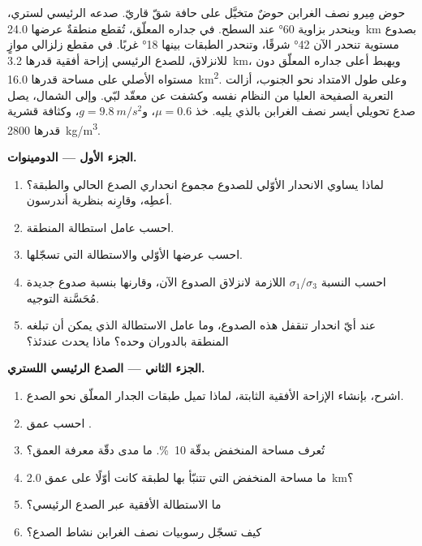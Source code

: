 \begin{problem}
\label{pb:b3:extension-strike-slip:1}
حوض مِيرو نصف الغرابن حوضٌ متخيَّل على حافة
شقّ قاريّ. صدعه الرئيسي لستري، وينحدر بزاوية \ang{60} عند السطح.
في جداره المعلّق، تُقطع منطقةٌ عرضها \qty{24.0}{km} بصدوع مستوية تنحدر الآن
\ang{42} شرقًا، وتنحدر الطبقات بينها \ang{18} غربًا. في مقطع زلزالي
موازٍ للانزلاق، للصدع الرئيسي إزاحة أفقية قدرها \qty{3.2}{km}،
ويهبط أعلى جداره المعلّق دون مستواه الأصلي على مساحة قدرها
\qty{16.0}{km^2}. وعلى طول الامتداد نحو الجنوب، أزالت التعرية الصفيحة العليا
من النظام نفسه وكشفت عن معقّد لبّي. وإلى الشمال، يصل صدع تحويلي أيسر
نصف الغرابن بالذي يليه. خذ $\mu =
0.6$، و$g = \qty{9.8}{m/s^2}$، وكثافة قشرية قدرها
\qty{2800}{kg/m^3}.

\medskip\noindent\textbf{الجزء الأول --- الدومينوات.}
\begin{enumerate}
  \item لماذا يساوي الانحدار الأوّلي للصدوع مجموع انحداري الصدع الحالي
        والطبقة؟ أعطِه، وقارِنه بنظرية أندرسون.
  \item احسب عامل استطالة المنطقة.
  \item احسب عرضها الأوّلي والاستطالة التي تسجّلها.
  \item احسب النسبة $\sigma_1/\sigma_3$ اللازمة لانزلاق الصدوع الآن، وقارنها
        بنسبة صدوع جديدة مُحَسَّنة التوجيه.
  \item عند أيّ انحدار تنقفل هذه الصدوع، وما عامل الاستطالة الذي يمكن أن تبلغه
        المنطقة بالدوران وحده؟ ماذا يحدث عندئذ؟
\end{enumerate}

\medskip\noindent\textbf{الجزء الثاني --- الصدع الرئيسي اللستري.}
\begin{enumerate}[resume]
  \item اشرح، بإنشاء الإزاحة الأفقية الثابتة، لماذا تميل طبقات الجدار المعلّق
        نحو الصدع.
  \item احسب عمق .
  \item تُعرف مساحة المنخفض بدقّة \qty{10}{\percent}. ما مدى
        دقّة معرفة العمق؟
  \item ما مساحة المنخفض التي تتنبّأ بها لطبقة كانت أوّلًا
        على عمق \qty{2.0}{km}؟
  \item ما الاستطالة الأفقية عبر الصدع الرئيسي؟
  \item كيف تسجّل رسوبيات نصف الغرابن نشاط
        الصدع؟
\end{enumerate}


\end{problem}
